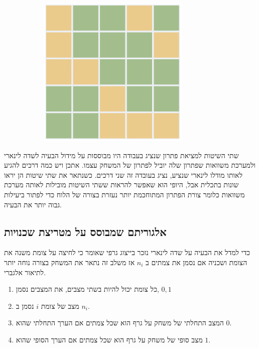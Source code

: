 \documentclass[12pt,leqno]{article}
\theoremstyle{theoremdd}
\begin{document}
\begin{figure}[ht]
\begin{subfigure}[b]{.25\linewidth}
    \end{subfigure}
    \begin{subfigure}[b]{.25\linewidth}
    \includegraphics[width=0.95\linewidth]{images/5x5_sol.PNG}
    \end{subfigure}
\end{figure}

שתי השיטות למציאת פתרון שנציג בעבודה היו מבוססות
על מידול הבעיה לשדה לינארי ולמערכת משוואות שפתרון שלה יוביל לפתרון של המשחק עצמו.
אתכן ויש כמה דרכים להגיע לאותו מודלו לינארי שנציע, נציג בעובדה זה שני דרכים.
כשנתאר את שתי שיטות הן יראו שונות בתכלית אבל,
היופי הוא שאפשר להראות ששתי השיטות מובילות לאותה מערכת משוואות
כלומר צורת הפתרון המתוחכמת יותר נעזרת בצורה של הלוח כדי לפתור ביעילות גבוה יותר את הבעיה.

\subsection{אלגוריתם שמבוסס על מטריצת שכנויות}
כדי למדל את הבעיה על שדה לינארי נזכר בייצוג גרפי שאומר כי לחיצה על צומת משנה את הצומת ושכניה 
אם נסמן את צמתים ב
$n_i$
אז משלב זה נתאר את המשחק בצורה נוחה יותר לתיאור אלגברי.
\begin{enumerate}
    \item 
    כל צומת יכול להיות בשתי מצבים,
    את המצבים נסמן,
    ${0,1}$
    \item 
    מצב של צומת 
    $i$
    נסמן ב
    $n_i$.
    \item 
    המצב התחלתי של משחק על גרף הוא שכל צמתים אם הערך התחלתי
    שהוא 
    $0$.
    \item 
    מצב סופי של משחק
    על גרף הוא שכל צמתים 
    אם הערך הסופי
    שהוא
    $1$.
\end{enumerate}
\end{document}
